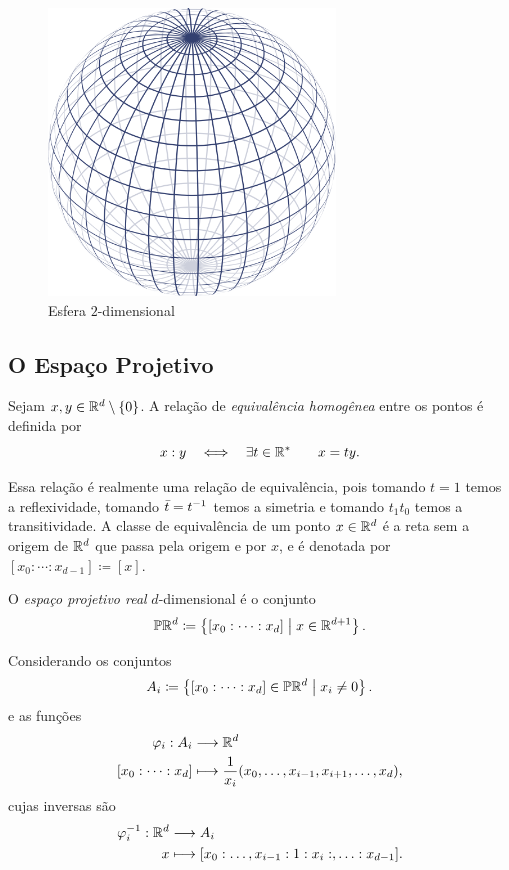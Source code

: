 \begin{figure}[!h]
\centering
\includegraphics[width=3in]{./imagens/esfera}
\caption{Esfera $2$-dimensional}
\end{figure}

\subsection{O Espaço Projetivo}

\begin{defi}
Sejam $x,y \in \mathbb{R}^d\setminus\{0\}$. A relação de \emph{equivalência homogênea} entre os pontos é definida por
	\begin{equation*}
	x : y \quad \Longleftrightarrow \quad \exists t \in \mathbb{R}^* \qquad x = ty.
	\end{equation*}
\end{defi}

Essa relação é realmente uma relação de equivalência, pois tomando $t=1$ temos a reflexividade, tomando $\bar t = t^{-1}$ temos a simetria e tomando $t_1t_0$ temos a transitividade. A classe de equivalência de um ponto $x \in \mathbb{R}^d$ é a reta sem a origem de $\mathbb{R}^d$ que passa pela origem e por $x$, e é denotada por $[x_0 : \cdots : x_{d-1}] \coloneqq [x]$.

\begin{defi}
O \emph{espaço projetivo real} $d$-dimensional é o conjunto
	\begin{equation*}
	\mathbb{P}\mathbb{R}^d \coloneqq \left\{[x_0 : \cdots : x_d] \;\middle\vert\; x \in \mathbb{R}^{d+1} \right\}.
	\end{equation*}
\end{defi}

Considerando os conjuntos
	\begin{equation*}
	A_i \coloneqq \left\{[x_0 : \cdots : x_d] \in \mathbb{P}\mathbb{R}^d \;\middle\vert\; x_i \neq 0 \right\}.
	\end{equation*}
e as funções
	\begin{align*}
	{\varphi_i}: {A_i} &\longrightarrow {\mathbb{R}^d} \\{[x_0 : \cdots : x_d]} &\longmapsto {\frac{1}{x_i}(x_0,\ldots,x_{i-1},x_{i+1},\ldots,x_d)},
	\end{align*}
cujas inversas são
	\begin{align*}
	{\varphi_i^{-1}}: {\mathbb{R}^d} &\longrightarrow {A_i} \\{x} &\longmapsto {[x_0:\ldots,x_{i-1}:1:x_i:,\ldots:x_{d-1}]}.
	\end{align*}


